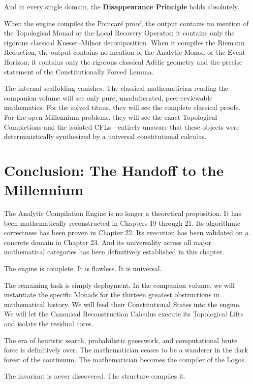 \documentclass[12pt,openany]{extbook}
\theoremstyle{plain}
\theoremstyle{definition}
\begin{document}
And in every single domain, the \textbf{Disappearance Principle} holds absolutely.

When the engine compiles the Poincar\'e proof, the output contains no mention of the Topological Monad or the Local Recovery Operator; it contains only the rigorous classical Kneser--Milnor decomposition. When it compiles the Riemann Reduction, the output contains no mention of the Analytic Monad or the Event Horizon; it contains only the rigorous classical Ad\`elic geometry and the precise statement of the Constitutionally Forced Lemma.

The internal scaffolding vanishes. The classical mathematician reading the companion volume will see only pure, unadulterated, peer-reviewable mathematics. For the solved titans, they will see the complete classical proofs. For the open Millennium problems, they will see the exact Topological Completions and the isolated CFLs---entirely unaware that these objects were deterministically synthesized by a universal constitutional calculus.

\section{Conclusion: The Handoff to the Millennium}

The Analytic Compilation Engine is no longer a theoretical proposition. It has been mathematically reconstructed in Chapters 19 through 21. Its algorithmic correctness has been proven in Chapter 22. Its execution has been validated on a concrete domain in Chapter 23. And its universality across all major mathematical categories has been definitively established in this chapter.

The engine is complete. It is flawless. It is universal.

The remaining task is simply deployment. In the companion volume, we will instantiate the specific Monads for the thirteen greatest obstructions in mathematical history. We will feed their Constitutional States into the engine. We will let the Canonical Reconstruction Calculus execute its Topological Lifts and isolate the residual cores.

The era of heuristic search, probabilistic guesswork, and computational brute force is definitively over. The mathematician ceases to be a wanderer in the dark forest of the continuum. The mathematician becomes the compiler of the Logos.

The invariant is never discovered. The structure compiles it.
\end{document}

